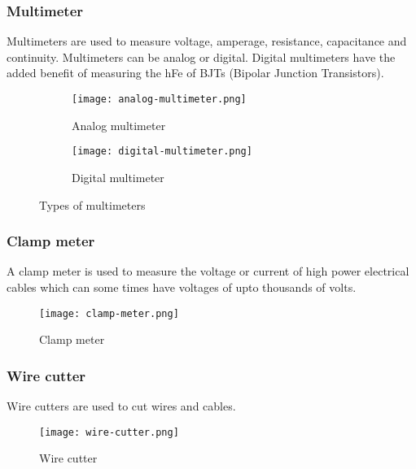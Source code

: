 \documentclass[a4paper,12pt]{article}
\begin{document}
				\subsubsection*{Multimeter}
					Multimeters are used to measure voltage, amperage, resistance, capacitance and continuity.
					Multimeters can be analog or digital.
					Digital multimeters have the added benefit of measuring the hFe of BJTs (Bipolar Junction Transistors).
					
						\begin{figure}[H]					
							\begin{subfigure}{0.4\textwidth}
								\centering				
								\texttt{[image: analog-multimeter.png]}
								\caption{Analog multimeter}
								\label{subfig:analog-multitmeter}
							\end{subfigure}
							\hfill
							\begin{subfigure}{0.5\textwidth}
								\centering				
								\texttt{[image: digital-multimeter.png]}
								\caption{Digital multimeter}
								\label{subfig:digital-multitmeter}
							\end{subfigure}
							\label{fig:types-of-multimeters}
							\caption{Types of multimeters}
						\end{figure}
				\subsubsection*{Clamp meter}
					A clamp meter is used to measure the voltage or current of high power electrical cables which can some times have voltages of upto thousands of volts. 
						\begin{figure}[H]
							\centering				
							\texttt{[image: clamp-meter.png]}
							\caption{Clamp meter}
							\label{fig:clamp-meter}
						\end{figure}
						
				\subsubsection*{Wire cutter}
					Wire cutters are used to cut wires and cables.
					
						\begin{figure}[H]
							\centering				
							\texttt{[image: wire-cutter.png]}
							\caption{Wire cutter}
							\label{fig:wire-cutter}
						\end{figure}
						
\end{document}
